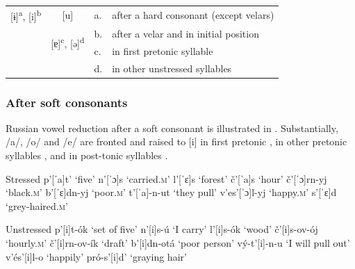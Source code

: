 \documentclass[output=paper,modfonts,newtxmath,hidelinks,]{langscibook}
\begin{document}
\label{5:4}\\\medskip
\begin{tabular}{|p{1.7cm}|p{1.7cm}|ll}
\cline{1-2}
\multicolumn{1}{|c|}{[ɨ]\textsuperscript{a}, [i]\textsuperscript{b}}&\multicolumn{1}{|c|}{[u]}&a.&after a hard consonant (except velars)\\\hhline{--~~}
\multicolumn{1}{|c|}{\shadecell}&\multicolumn{1}{|c|}{\multirow{2}{*}{[ɐ]\textsuperscript{c}, [ə]\textsuperscript{d}}}&b.&after a velar and in initial position\\\cline{1-1}
\multicolumn{1}{|p{1.7cm}}{}&&c.&in first pretonic syllable\\\cline{1-2}
\multicolumn{2}{c}{}&d.&in other unstressed syllables\\
\end{tabular}
\z


\subsubsection{After soft consonants}\label{5:s2.1.2}

Russian vowel reduction after a soft consonant is illustrated in . Substantially, /a/, /o/ and /e/ are fronted and raised to [i] in first pretonic , in other pretonic syllables , and in post-tonic syllables .

\ea\label{5:5}\begin{multicols}{2}
\begin{xlist}
\exi{} {Stressed}
\ex p’[ˈa]t’ \tabto{2.1cm}‘five’\label{5:5a}
\exi{} n’[ˈɔ]s \tabto{2.1cm}‘carried.\textsc{m}’
\exi{} l’[ˈɛ]s \tabto{2.1cm}‘forest’
\ex č’[ˈa]s \tabto{2.1cm}‘hour’\label{5:5b}
\exi{} č’[ˈɔ]rn-yj \tabto{2.1cm}‘black.\textsc{m}’
\exi{} b’[ˈɛ]dn-yj \tabto{2.1cm}‘poor.\textsc{m}’
\ex t’[ˈa]-n-ut \tabto{2.1cm}‘they pull’\label{5:5c}
\exi{} v’es’[ˈɔ]l-yj \tabto{2.1cm}‘happy.\textsc{m}’
\exi{} s’[ˈɛ]d \tabto{2.1cm}‘grey-haired.\textsc{m}’
\end{xlist}\columnbreak
\begin{xlist}
\exi{} {Unstressed}
\exi{} p’[i]t-ók \tabto{2.1cm}‘set of five’
\exi{} n’[i]s-ú \tabto{2.1cm}‘I carry’
\exi{} l’[i]s-ók \tabto{2.1cm}‘wood’
\exi{} č’[i]s-ov-ój \tabto{2.1cm}‘hourly.\textsc{m}’
\exi{} č’[i]rn-ov-ík \tabto{2.1cm}‘draft’
\exi{} b’[i]dn-otá \tabto{2.1cm}‘poor person’
\exi{} vý-t’[i]-n-u \tabto{2.1cm}‘I will pull out’
\exi{} v’és’[i]l-o \tabto{2.1cm}‘happily’
\exi{} pró-s’[i]d’ \tabto{2.1cm}‘graying hair’
\end{xlist}
\end{multicols}
\z
\end{document}

